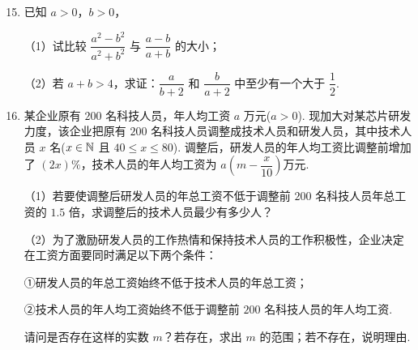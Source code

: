 \documentclass[a4paper,11pt]{article}
\begin{document}
\begin{enumerate}
\setcounter{enumi}{14}

\item 已知 $a>0$，$b>0$，

（1）试比较 $\dfrac{a^2-b^2}{a^2+b^2}$ 与 $\dfrac{a-b}{a+b}$ 的大小；

（2）若 $a+b>4$，求证：$\dfrac a{b+2}$ 和 $\dfrac b{a+2}$ 中至少有一个大于 $\dfrac12$.

\ifanswer
\solbegin
{}
\solend
\fi

\item 某企业原有 $200$ 名科技人员，年人均工资 $a$ 万元($a>0$). 现加大对某芯片研发力度，该企业把原有 $200$ 名科技人员调整成技术人员和研发人员，其中技术人员 $x$ 名($x\in\mathbb{N}$ 且 $40\leqslant x\leqslant80$). 调整后，研发人员的年人均工资比调整前增加了 $(2x)\%$，技术人员的年人均工资为 $a\left(m-\dfrac x{10}\right)$万元.

（1）若要使调整后研发人员的年总工资不低于调整前 $200$ 名科技人员年总工资的 $1.5$ 倍，求调整后的技术人员最少有多少人？

（2）为了激励研发人员的工作热情和保持技术人员的工作积极性，企业决定在工资方面要同时满足以下两个条件：

①研发人员的年总工资始终不低于技术人员的年总工资；

②技术人员的年人均工资始终不低于调整前 $200$ 名科技人员的年人均工资.

请问是否存在这样的实数 $m$？若存在，求出 $m$ 的范围；若不存在，说明理由.


\end{enumerate}
\end{document}
